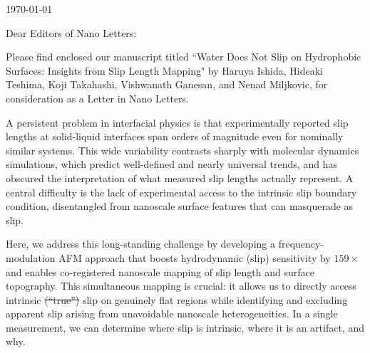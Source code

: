 ﻿\documentclass{article}
\providecommand{\DIFdeltex}[1]{{\protect\color{red}\sout{#1}}} %
\providecommand{\DIFdelbegin}{} %
\providecommand{\DIFdelend}{} %
\providecommand{\DIFdel}[1]{\texorpdfstring{\DIFdeltex{#1}}{}} %
\begin{document}
\today

Dear Editors of Nano Letters:

Please find enclosed our manuscript titled ``Water Does Not Slip on Hydrophobic Surfaces: Insights from Slip Length Mapping" by Haruya Ishida, Hideaki Teshima, Koji Takahashi, Vishwanath Ganesan, and Nenad Miljkovic, for consideration as a Letter in Nano Letters.

A persistent problem in interfacial physics is that experimentally reported slip lengths at solid-liquid interfaces span orders of magnitude even for nominally similar systems. This wide variability contrasts sharply with molecular dynamics simulations, which predict well-defined and nearly universal trends, and has obscured the interpretation of what measured slip lengths actually represent. A central difficulty is the lack of experimental access to the intrinsic slip boundary condition, disentangled from nanoscale surface features that can masquerade as slip.

Here, we address this long-standing challenge by developing a frequency-modulation AFM approach that boosts hydrodynamic (slip) sensitivity by $159\times$ and enables co-registered nanoscale mapping of slip length and surface topography. This simultaneous mapping is crucial: it allows us to directly access intrinsic \DIFdelbegin \DIFdel{(``true'') }\DIFdelend slip on genuinely flat regions while identifying and excluding apparent slip arising from unavoidable nanoscale heterogeneities. In a single measurement, we can determine where slip is intrinsic, where it is an artifact, and why.
\end{document}
